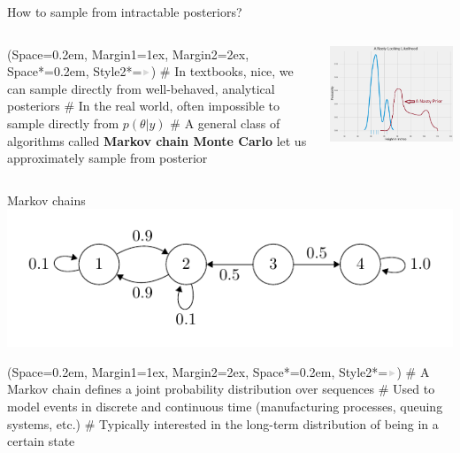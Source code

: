 \documentclass[12pt, aspectratio=149]{beamer}
\newcommand{\listSpace}{0.2em}
\theoremstyle{plain}
\begin{document}
\begin{frame}[fragile]{How to sample from intractable posteriors?}
	\begin{columns}
		\begin{column}{0.5\linewidth}
		\begin{easylist}
			\ListProperties(Space=\listSpace, Margin1=1ex, Margin2=2ex, Space*=\listSpace, Style2*=$\color{bggraydark}\blacktriangleright$\space)
			# In textbooks, nice, we can sample directly from well-behaved, analytical posteriors
			# In the real world, often impossible to sample directly from $p(\theta \vert y)$
			# A general class of algorithms called \textbf{Markov chain Monte Carlo} let us approximately sample from posterior
		\end{easylist}		
		\end{column}
		\begin{column}{0.5\linewidth}
		\includegraphics[scale=0.2]{figs/nasty_prior_posterior_example.png}
		\end{column}
	\end{columns}
\end{frame}

\begin{frame}[fragile]{Markov chains}
	\includegraphics[scale=.8]{figs/irreducible.pdf}
	\begin{easylist}[itemize]
		\ListProperties(Space=\listSpace, Margin1=1ex, Margin2=2ex, Space*=\listSpace, Style2*=$\color{bggraydark}\blacktriangleright$\space)
		# A Markov chain defines a joint probability distribution over sequences
		# Used to model events in discrete and continuous time (manufacturing processes, queuing systems, etc.)
		# Typically interested in the long-term distribution of being in a certain state
	\end{easylist}
\end{frame}
\end{document}
